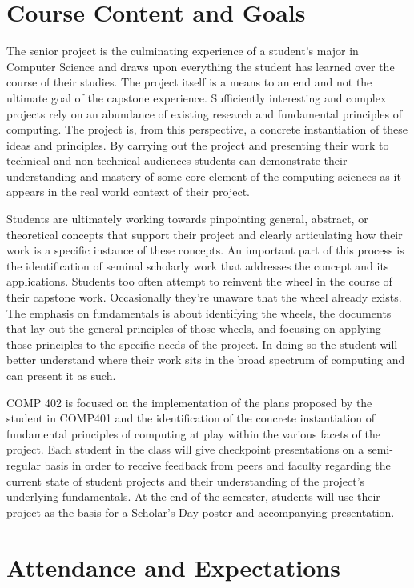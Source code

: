 \documentclass[nobib]{tufte-handout}
\begin{document}
\section{Course Content and Goals}

The senior project is the culminating experience of a student's major in Computer Science and draws upon everything the student has learned over the course of their studies. The project itself is a means to an end and not the ultimate goal of the capstone experience. Sufficiently interesting and complex projects rely on an abundance of existing research and fundamental principles of computing.  The project is, from this perspective, a concrete instantiation of these ideas and principles. By carrying out the project and presenting their work to technical and non-technical audiences students can demonstrate their understanding and mastery of some core element of the computing sciences as it appears in the real world context of their project.

Students are ultimately working towards pinpointing general, abstract, or theoretical concepts that support their project and clearly articulating how their work is a specific instance of these concepts. An important part of this process is the identification of seminal scholarly work that addresses the concept and its applications. Students too often attempt to reinvent the wheel in the course of their capstone work. Occasionally they're unaware that the wheel already exists. The emphasis on fundamentals is about identifying the wheels, the documents that lay out the general principles of those wheels, and focusing on applying those principles to the specific needs of the project. In doing so the student will better understand where their work sits in the broad spectrum of computing and can present it as such.

COMP 402 is focused on the implementation of the plans proposed by the student in COMP401 and the identification of the concrete instantiation of fundamental principles of computing at play within the various facets of the project. Each student in the class will give checkpoint presentations on a semi-regular basis in order to receive feedback from peers and faculty regarding the current state of student projects and their understanding of the project's underlying fundamentals.   At the end of the semester, students will use their project as the basis for a Scholar's Day poster and accompanying presentation.



\section{Attendance and Expectations}
\end{document}
